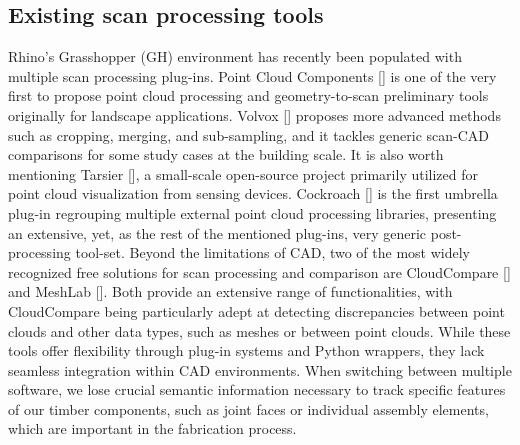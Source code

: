 \subsection{Existing scan processing tools}
\label{sec:rel:timber_eval}
Rhino's Grasshopper (GH) environment has recently been populated with multiple scan processing plug-ins. Point Cloud Components [\cite{Lin2014}] is one of the very first to propose point cloud processing and geometry-to-scan preliminary tools originally for landscape applications. Volvox [\cite{Zwierzycki2016}] proposes more advanced methods such as cropping, merging, and sub-sampling, and it tackles generic scan-CAD comparisons for some study cases at the building scale. It is also worth mentioning Tarsier [\cite{Tarsier2016}], a small-scale open-source project primarily utilized for point cloud visualization from sensing devices. Cockroach [\cite{SettimiCkrch2022}] is the first umbrella plug-in regrouping multiple external point cloud processing libraries, presenting an extensive, yet, as the rest of the mentioned plug-ins, very generic post-processing tool-set.
Beyond the limitations of CAD, two of the most widely recognized free solutions for scan processing and comparison are CloudCompare [\cite{CloudCompare2016}] and MeshLab [\cite{MeshLab2008}]. Both provide an extensive range of functionalities, with CloudCompare being particularly adept at detecting discrepancies between point clouds and other data types, such as meshes or between point clouds. While these tools offer flexibility through plug-in systems and Python wrappers, they lack seamless integration within CAD environments. When switching between multiple software, we lose crucial semantic information necessary to track specific features of our timber components, such as joint faces or individual assembly elements, which are important in the fabrication process.


